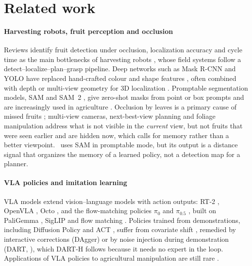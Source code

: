 \section{Related work}
\label{sec:related}

\paragraph{Harvesting robots, fruit perception and occlusion} Reviews identify fruit detection under occlusion, localization accuracy and cycle time as the main bottlenecks of harvesting robots \citep{bac2014harvesting,kootstra2021selective,zhou2022intelligent}, whose field systems follow a detect--localize--plan--grasp pipeline. Deep networks such as Mask R-CNN \citep{he2017maskrcnn} and YOLO \citep{redmon2016yolo} have replaced hand-crafted colour and shape features \citep{sa2016deepfruits,kamilaris2018survey,koirala2019review}, often combined with depth or multi-view geometry for 3D localization \citep{gene2020fruit,kang2020apple}. Promptable segmentation models, SAM and SAM~2 \citep{kirillov2023sam,ravi2024sam2}, give zero-shot masks from point or box prompts and are increasingly used in agriculture . Occlusion by leaves is a primary cause of missed fruits \citep{hemming2014detectability}; multi-view cameras, next-best-view planning and foliage manipulation  address what is not visible in the \emph{current} view, but not fruits that were seen earlier and are hidden now, which calls for memory rather than a better viewpoint. \fdm\ uses SAM in promptable mode, but its output is a distance signal that organizes the memory of a learned policy, not a detection map for a planner.

\paragraph{VLA policies and imitation learning} VLA models extend vision--language models with action outputs: RT-2 \citep{brohan2023rt2}, OpenVLA \citep{kim2024openvla}, Octo \citep{octo2024}, and the flow-matching policies $\pi_0$ and $\pi_{0.5}$ \citep{black2024pi0,pi05_2025}, built on PaliGemma \citep{beyer2024paligemma}, SigLIP \citep{zhai2023siglip} and flow matching \citep{lipman2023flow}. Policies trained from demonstrations, including Diffusion Policy \citep{chi2023diffusion} and ACT \citep{zhao2023act}, suffer from covariate shift \citep{ross2011dagger}, remedied by interactive corrections (DAgger) or by noise injection during demonstration (DART, \citealp{laskey2017dart}), which DART-H follows because it needs no expert in the loop. Applications of VLA policies to agricultural manipulation are still rare .

